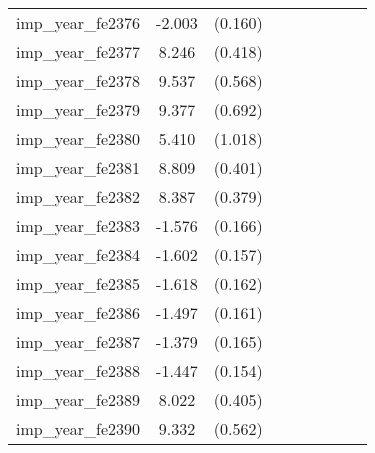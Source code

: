 {\begin{tabular}{l*{4}{cc}}
imp\_year\_fe2376&   -2.003\sym{***}&  (0.160)&                  &         &                  &         &                  &         \\
imp\_year\_fe2377&    8.246\sym{***}&  (0.418)&                  &         &                  &         &                  &         \\
imp\_year\_fe2378&    9.537\sym{***}&  (0.568)&                  &         &                  &         &                  &         \\
imp\_year\_fe2379&    9.377\sym{***}&  (0.692)&                  &         &                  &         &                  &         \\
imp\_year\_fe2380&    5.410\sym{***}&  (1.018)&                  &         &                  &         &                  &         \\
imp\_year\_fe2381&    8.809\sym{***}&  (0.401)&                  &         &                  &         &                  &         \\
imp\_year\_fe2382&    8.387\sym{***}&  (0.379)&                  &         &                  &         &                  &         \\
imp\_year\_fe2383&   -1.576\sym{***}&  (0.166)&                  &         &                  &         &                  &         \\
imp\_year\_fe2384&   -1.602\sym{***}&  (0.157)&                  &         &                  &         &                  &         \\
imp\_year\_fe2385&   -1.618\sym{***}&  (0.162)&                  &         &                  &         &                  &         \\
imp\_year\_fe2386&   -1.497\sym{***}&  (0.161)&                  &         &                  &         &                  &         \\
imp\_year\_fe2387&   -1.379\sym{***}&  (0.165)&                  &         &                  &         &                  &         \\
imp\_year\_fe2388&   -1.447\sym{***}&  (0.154)&                  &         &                  &         &                  &         \\
imp\_year\_fe2389&    8.022\sym{***}&  (0.405)&                  &         &                  &         &                  &         \\
imp\_year\_fe2390&    9.332\sym{***}&  (0.562)&                  &         &                  &         &                  &         \\

\end{tabular}}
